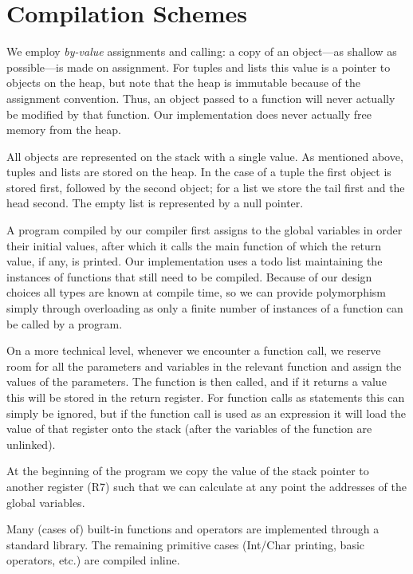 \documentclass[a4paper]{article}
\begin{document}
\section{Compilation Schemes}

We employ \emph{by-value} assignments and calling: a copy of an object---as shallow as possible---is made on assignment.
For tuples and lists this value is a pointer to objects on the heap, but note that the heap is immutable because of the assignment convention.
Thus, an object passed to a function will never actually be modified by that function.
Our implementation does never actually free memory from the heap. %

All objects are represented on the stack with a single value.
As mentioned above, tuples and lists are stored on the heap.
In the case of a tuple the first object is stored first, followed by the second object; for a list we store the tail first and the head second.
The empty list is represented by a null pointer.

A program compiled by our compiler first assigns to the global variables in order their initial values, after which it calls the main function of which the return value, if any, is printed.
Our implementation uses a todo list maintaining the instances of functions that still need to be compiled.
Because of our design choices all types are known at compile time, so we can provide polymorphism simply through overloading as only a finite number of instances of a function can be called by a program.

On a more technical level, whenever we encounter a function call, we reserve room for all the parameters and variables in the relevant function and assign the values of the parameters.
The function is then called, and if it returns a value this will be stored in the return register.
For function calls as statements this can simply be ignored, but if the function call is used as an expression it will load the value of that register onto the stack (after the variables of the function are unlinked).

At the beginning of the program we copy the value of the stack pointer to another register (R7) such that we can calculate at any point the addresses of the global variables.

Many (cases of) built-in functions and operators are implemented through a standard library.
The remaining primitive cases (Int/Char printing, basic operators, etc.) are compiled inline.
\end{document}
